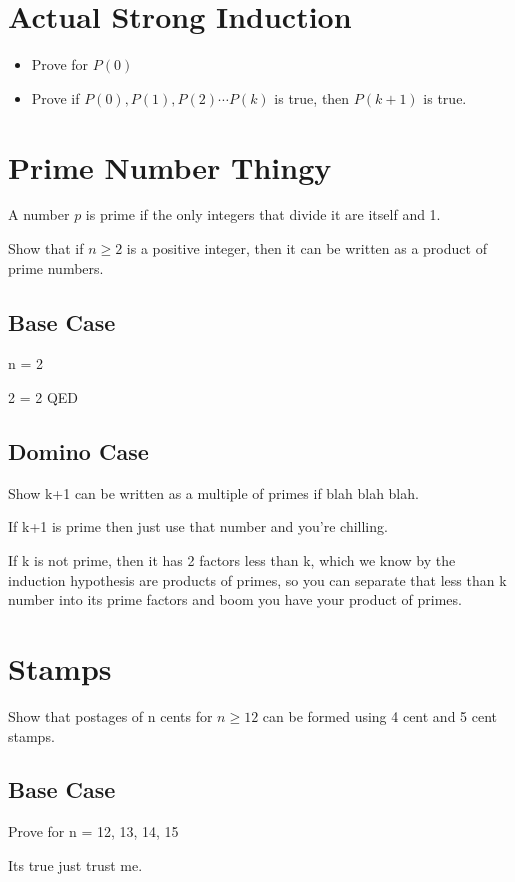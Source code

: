 \documentclass{report}
\begin{document}
\section{Actual Strong Induction}
\begin{itemize}
\item 
Prove for $P(0)$

\item
Prove if $P(0), P(1), P(2) \cdots P(k)$ is true, then $P(k+1)$ is true.

\end{itemize}

\section{Prime Number Thingy}
A number $p$ is prime if the only integers that divide it are itself and 1.

Show that if $n \geq 2$ is a positive integer, then it can be written as a product of prime numbers.

\subsection{Base Case}
n = 2

2 = 2 QED

\subsection{Domino Case}
Show k+1 can be written as a multiple of primes if blah blah blah.

If k+1 is prime then just use that number and you're chilling.

If k is not prime, then it has 2 factors less than k, which we know by the induction hypothesis are products of primes, so you can separate that less than k number into its prime factors and boom you have your product of primes.

\section{Stamps}
Show that postages of n cents for $n \geq 12$ can be formed using 4 cent and 5 cent stamps.

\subsection{Base Case}
Prove for n = 12, 13, 14, 15

Its true just trust me.
\end{document}
